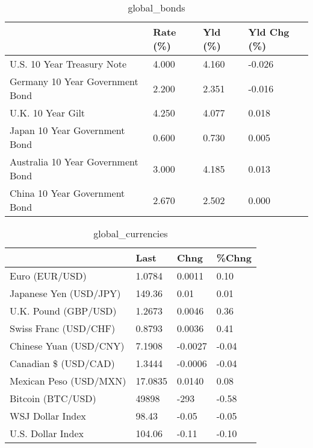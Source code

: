 \documentclass{article}%
\begin{document}
%


\begin{table}[htbp]%
\caption{global\_bonds}%
\centering%
\begin{adjustbox}{width=1\textwidth}%
\begin{tabular}{llll}
\toprule
                                  & Rate (\%) & Yld (\%) & Yld Chg (\%) \\
\midrule
       U.S. 10 Year Treasury Note &    4.000 &   4.160 &      -0.026 \\
  Germany 10 Year Government Bond &    2.200 &   2.351 &      -0.016 \\
                U.K. 10 Year Gilt &    4.250 &   4.077 &       0.018 \\
    Japan 10 Year Government Bond &    0.600 &   0.730 &       0.005 \\
Australia 10 Year Government Bond &    3.000 &   4.185 &       0.013 \\
    China 10 Year Government Bond &    2.670 &   2.502 &       0.000 \\
\bottomrule
\end{tabular}
%
\end{adjustbox}%
\end{table}

%


\begin{table}[htbp]%
\caption{global\_currencies}%
\centering%
\begin{adjustbox}{width=1\textwidth}%
\begin{tabular}{llll}
\toprule
                       &    Last &    Chng & \%Chng \\
\midrule
        Euro (EUR/USD) &  1.0784 &  0.0011 &  0.10 \\
Japanese Yen (USD/JPY) &  149.36 &    0.01 &  0.01 \\
  U.K. Pound (GBP/USD) &  1.2673 &  0.0046 &  0.36 \\
 Swiss Franc (USD/CHF) &  0.8793 &  0.0036 &  0.41 \\
Chinese Yuan (USD/CNY) &  7.1908 & -0.0027 & -0.04 \\
  Canadian \$ (USD/CAD) &  1.3444 & -0.0006 & -0.04 \\
Mexican Peso (USD/MXN) & 17.0835 &  0.0140 &  0.08 \\
     Bitcoin (BTC/USD) &   49898 &    -293 & -0.58 \\
      WSJ Dollar Index &   98.43 &   -0.05 & -0.05 \\
     U.S. Dollar Index &  104.06 &   -0.11 & -0.10 \\
\bottomrule
\end{tabular}
%
\end{adjustbox}%
\end{table}
\end{document}
